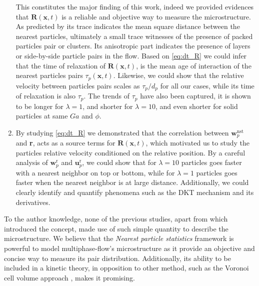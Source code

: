 \begin{enumerate}
    This constitutes the major finding of this work, indeed we provided evidences that $\textbf{R}(\textbf{x},t)$ is a reliable and objective way to measure the microstructure.
    As predicted by \citet{zhang2023evolution} its trace indicates the mean square distance between the nearest particles, ultimately a small trace witnesses of the presence of packed particles pair or clusters.
    Its anisotropic part indicates the presence of layers or side-by-side particle pairs in the flow. 
    Based on \ref{eq:dt_R} we could infer that the time of relaxation of $\textbf{R}(\textbf{x},t)$, is the mean age of interaction of the  nearest particles pairs $\tau_p(\textbf{x},t)$. 
    Likewise, we could show that the relative velocity between particles pairs scales as $\tau_p /d_p$ for all our cases, while its time of relaxation is also $\tau_p$. 
    The trends of $\tau_p$ have also been captured, it is shown to be longer for $\lambda = 1$, and shorter for $\lambda = 10$, and even shorter for solid particles at same $Ga$ and $\phi$. 
    \item 
    By studying \ref{eq:dt_R} we demonstrated that the correlation between $\textbf{w}_p^\text{nst}$ and \textbf{r}, acts as a source terms for $\textbf{R}(\textbf{x},t)$, which motivated us to study the particles relative velocity conditioned on the relative position. 
    By a careful analysis of $\textbf{w}_p^\text{r}$ and $\textbf{u}_p^\text{r}$, we could show that for $\lambda = 10$ particles goes faster with a nearest neighbor on top or bottom, while for $\lambda = 1$ particles goes faster when the nearest neighbor is at large distance.
    Additionally, we could clearly identify and quantify phenomena such as the DKT mechanism and its derivatives. 
\end{enumerate}
To the author knowledge, none of the previous studies, apart from \citet{zhang2023evolution} which introduced the concept, made use of such simple quantity to describe the microstructure. 
We believe that the \textit{Nearest particle statistics} framework is powerful to model multiphase-flow's microstructure as it provide an objective and concise way to measure its pair distribution. 
Additionally, its ability to be included in a kinetic theory, in opposition to other method,  such as the Voronoi cell volume approach \citep{senthil2005voronoi}, makes it promising. 


